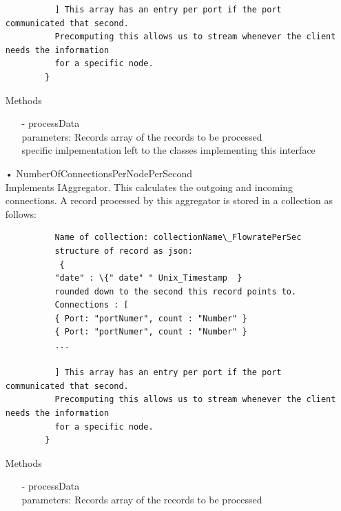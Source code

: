 \documentclass[oneside, english, final]{design}
\begin{document}
\begin{itemize}
\begin{verbatim}
		  ] This array has an entry per port if the port communicated that second. 
		  Precomputing this allows us to stream whenever the client needs the information 
		  for a specific node.
		}
	      \end{verbatim}
	      Methods
	      \begin{itemize}
		      \item[-]processData
		            \\parameters: Records array of the records to be processed
		            \\ specific imlpementation left to the classes implementing this interface
	      \end{itemize}

	\item[•] NumberOfConnectionsPerNodePerSecond
	      \\Implements IAggregator. This calculates the outgoing and incoming connections.
	      A record processed by this aggregator is stored in a collection as follows:
	      \begin{verbatim} 
		  Name of collection: collectionName\_FlowratePerSec
		  structure of record as json:
		   {
		  "date" : \{" date" " Unix_Timestamp  } 
		  rounded down to the second this record points to.
		  Connections : [
		  { Port: "portNumer", count : "Number" }
		  { Port: "portNumer", count : "Number" }
		  ...
		  
		  ] This array has an entry per port if the port communicated that second. 
		  Precomputing this allows us to stream whenever the client needs the information 
		  for a specific node.
		}
	      \end{verbatim}
	      Methods
	      \begin{itemize}
		      \item[-]processData
		            \\parameters: Records array of the records to be processed
	      \end{itemize}


\end{itemize}
\end{document}
